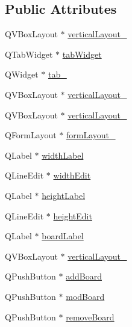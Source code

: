 \subsection*{Public Attributes}
\begin{DoxyCompactItemize}
\item 
Q\+V\+Box\+Layout $\ast$ \hyperlink{class_ui___config_dialog_a9141cfed0055af2ecbbfd5487aef1903}{vertical\+Layout\+\_}
\item 
Q\+Tab\+Widget $\ast$ \hyperlink{class_ui___config_dialog_a4fa1e74da69f83e1cc9c1a7ff1d8960f}{tab\+Widget}
\item 
Q\+Widget $\ast$ \hyperlink{class_ui___config_dialog_a12b728fba2970afdaebad7247ad53600}{tab\+\_}
\item 
Q\+V\+Box\+Layout $\ast$ \hyperlink{class_ui___config_dialog_a6a2441f775a12786a0ce914c45e1a36d}{vertical\+Layout\+\_}
\item 
Q\+V\+Box\+Layout $\ast$ \hyperlink{class_ui___config_dialog_a07a028a1343e70ca5dd7b3522102c59c}{vertical\+Layout\+\_}
\item 
Q\+Form\+Layout $\ast$ \hyperlink{class_ui___config_dialog_abf370e7048f4f5afafe590b3f123e14d}{form\+Layout\+\_}
\item 
Q\+Label $\ast$ \hyperlink{class_ui___config_dialog_ac1e0c52bb44a3886e42512ace1d5c473}{width\+Label}
\item 
Q\+Line\+Edit $\ast$ \hyperlink{class_ui___config_dialog_ab1b599ab005a5e4636fcf48f28ec5936}{width\+Edit}
\item 
Q\+Label $\ast$ \hyperlink{class_ui___config_dialog_a0cdace303288854835b8eb748f68eb89}{height\+Label}
\item 
Q\+Line\+Edit $\ast$ \hyperlink{class_ui___config_dialog_a1b12fcc75caa1ab34805399f9944e883}{height\+Edit}
\item 
Q\+Label $\ast$ \hyperlink{class_ui___config_dialog_ac0989acda5f0d1254a61f395b1bc9ef4}{board\+Label}
\item 
Q\+V\+Box\+Layout $\ast$ \hyperlink{class_ui___config_dialog_a785cf33da0a1506fd27a8c5b2e27587c}{vertical\+Layout\+\_}
\item 
Q\+Push\+Button $\ast$ \hyperlink{class_ui___config_dialog_afcb0ef08fb72c3e34f54d4e0aeded233}{add\+Board}
\item 
Q\+Push\+Button $\ast$ \hyperlink{class_ui___config_dialog_a41ebe54e89f4e9c62300febaf55b5371}{mod\+Board}
\item 
Q\+Push\+Button $\ast$ \hyperlink{class_ui___config_dialog_a6016a737deb45657e0b8be8367e88fb1}{remove\+Board}

\end{DoxyCompactItemize}
